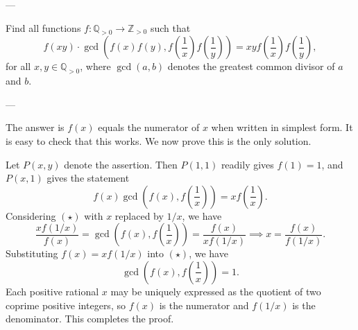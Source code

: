 
---

Find all functions $f:\mathbb Q_{>0}\to\mathbb Z_{>0}$ such that \[f(xy)\cdot \gcd\left(f(x)f(y),f\left(\frac1x\right)f\left(\frac1y\right)\right)=xyf\left(\frac1x\right)f\left(\frac1y\right),\]
for all $x,y\in\mathbb Q_{>0}$, where $\gcd(a,b)$ denotes the greatest common divisor of $a$ and $b$.

---

The answer is $f(x)$ equals the numerator of $x$ when written in simplest form. It is easy to check that this works. We now prove this is the only solution.

Let $P(x,y)$ denote the assertion. Then $P(1,1)$ readily gives $f(1)=1$, and $P(x,1)$ gives the statement \[f(x)\gcd\left(f(x),f\left(\frac1x\right)\right)=xf\left(\frac1x\right).\tag{\star}\]
Considering $(\star)$ with $x$ replaced by $1/x$, we have \[\frac{xf(1/x)}{f(x)}=\gcd\left(f(x),f\left(\frac1x\right)\right)=\frac{f(x)}{xf(1/x)}\implies x=\frac{f(x)}{f(1/x)}.\]
Substituting $f(x)=xf(1/x)$ into $(\star)$, we have \[\gcd\left(f(x),f\left(\frac1x\right)\right)=1.\]
Each positive rational $x$ may be uniquely expressed as the quotient of two coprime positive integers, so $f(x)$ is the numerator and $f(1/x)$ is the denominator. This completes the proof.


